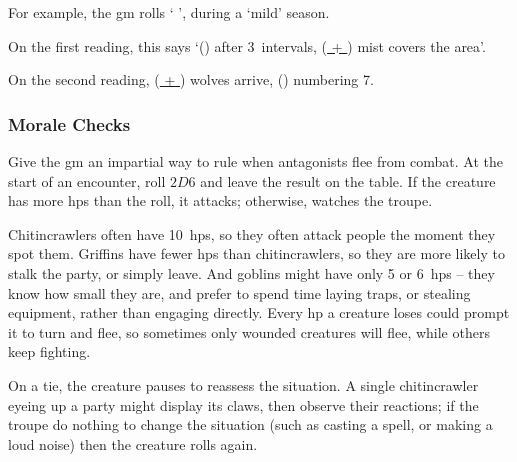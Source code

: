 \begin{multicols}{2}

\begin{exampletext}
  For example, the \gls{gm} rolls `  ', during a `mild' season.

  On the first reading, this says `() after 3~\glspl{interval}, (\underline{ + }) mist covers the area'.

  On the second reading, (\underline{ + }) wolves arrive, () numbering 7.


\end{exampletext}

\subsubsection{Morale Checks}
\label{morale}

Give the \gls{gm} an impartial way to rule when antagonists flee from combat.
At the start of an encounter, roll $2D6$ and leave the result on the table.
If the creature has more \glspl{hp} than the roll, it attacks; otherwise, watches the troupe.


Chitincrawlers often have 10~\glspl{hp}, so they often attack people the moment they spot them.
Griffins have fewer \glspl{hp} than chitincrawlers, so they are more likely to stalk the party, or simply leave.
And goblins might have only 5 or 6~\glspl{hp} -- they know how small they are, and prefer to spend time laying traps, or stealing equipment, rather than engaging directly.
Every \gls{hp} a creature loses could prompt it to turn and flee, so sometimes only wounded creatures will flee, while others keep fighting.

On a tie, the creature pauses to reassess the situation.
A single chitincrawler eyeing up a party might display its claws, then observe their reactions; if the troupe do nothing to change the situation (such as casting a spell, or making a loud noise) then the creature rolls again.


\end{multicols}
